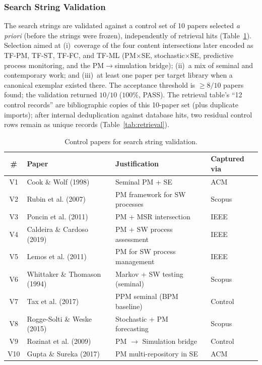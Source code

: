 \subsubsection{Search String Validation}

The search strings are validated against a control set of 10 papers selected
\emph{a priori} (before the strings were frozen), independently of retrieval
hits (Table~\ref{tab:validation-set}). Selection aimed at (i)~coverage of the
four content intersections later encoded as TF-PM, TF-ST, TF-FC, and TF-ML
(PM$\times$SE, stochastic$\times$SE, predictive process monitoring, and the
PM$\rightarrow$simulation bridge); (ii)~a mix of seminal and contemporary
work; and (iii)~at least one paper per target library when a canonical
exemplar existed there. The acceptance threshold is $\geq 8/10$ papers found;
the validation returned $10/10$ ($100\%$, PASS). The retrieval table's
``12 control records'' are bibliographic copies of this 10-paper set (plus
duplicate imports); after internal deduplication against database hits,
two residual control rows remain as unique records
(Table~\ref{tab:retrieval}).

\begin{table}[htbp]
\centering
\caption{Control papers for search string validation.}
\label{tab:validation-set}
\small
\setlength{\tabcolsep}{4pt}
\begin{tabular}{c p{4.5cm} p{4.1cm} p{1.6cm}}
\toprule
\textbf{\#} & \textbf{Paper} & \textbf{Justification} & \textbf{Captured via} \\
\midrule
V1  & Cook \& Wolf (1998)            & Seminal PM + SE                    & ACM \\
V2  & Rubin et al. (2007)            & PM framework for SW processes      & Scopus \\
V3  & Poncin et al. (2011)           & PM + MSR intersection              & IEEE \\
V4  & Caldeira \& Cardoso (2019)     & PM + SW process assessment         & IEEE \\
V5  & Lemos et al. (2011)            & PM for SW process management       & IEEE \\
V6  & Whittaker \& Thomason (1994)   & Markov + SW testing (seminal)      & Scopus \\
V7  & Tax et al. (2017)              & PPM seminal (BPM baseline)         & Control \\
V8  & Rogge-Solti \& Weske (2015)    & Stochastic + PM forecasting        & Scopus \\
V9  & Rozinat et al. (2009)          & PM $\rightarrow$ Simulation bridge & Control \\
V10 & Gupta \& Sureka (2017)         & PM multi-repository in SE          & ACM \\
\bottomrule
\end{tabular}
\end{table}


